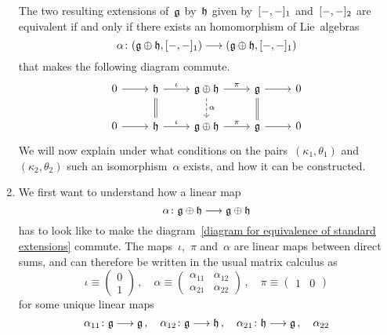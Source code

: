 \begin{fluff}
\begin{enumerate}[resume*]
			The two resulting extensions of~$\mathfrak{g}$ by~$\mathfrak{h}$ given by~$[-, -]_1$ and~$[-, -]_2$ are equivalent if and only if there exists an homomorphism of Lie~algebras
			\[
				\alpha
				\colon
				( \glie \oplus \hlie, [\ph, \ph]_1 )
				\to
				( \glie \oplus \hlie, [\ph, \ph]_1 )
			\]
			that makes the following diagram commute.
			\begin{equation}
				\label{diagram for equivalence of standard extensions}
				\begin{tikzcd}
					0
					\arrow{r}
					&
					\hlie
					\arrow{r}[above]{\iota}
					\arrow[equal]{d}
					&
					\glie \oplus \hlie
					\arrow{r}[above]{\pi}
					\arrow[dashed]{d}[right]{\alpha}
					&
					\glie
					\arrow{r}
					\arrow[equal]{d}
					&
					0
					\\
					0
					\arrow{r}
					&
					\hlie
					\arrow{r}[above]{\iota}
					&
					\glie \oplus \hlie
					\arrow{r}[above]{\pi}
					&
					\glie
					\arrow{r}
					&
					0
				\end{tikzcd}
			\end{equation}
			We will now explain under what conditions on the pairs~$(\kappa_1, \theta_1)$ and~$(\kappa_2, \theta_2)$ such an isomorphism~$\alpha$ exists, and how it can be constructed.
		\item
			We first want to understand how a linear map
			\[
				\alpha
				\colon
				\glie \oplus \hlie
				\to
				\glie \oplus \hlie
			\]
			has to look like to make the diagram~\eqref{diagram for equivalence of standard extensions} commute.
			The maps~$\iota$,~$\pi$ and~$\alpha$ are linear maps between direct sums, and can therefore be written in the usual matrix calculus as
			\[
				\iota
				\equiv
				\begin{pmatrix}
					0
					\\
					1
				\end{pmatrix} \,,
				\quad
				\alpha
				\equiv
				\begin{pmatrix}
					\alpha_{11} & \alpha_{12} \\
					\alpha_{21} & \alpha_{22}
				\end{pmatrix} \,,
				\quad
				\pi
				\equiv
				\begin{pmatrix}
					1 & 0
				\end{pmatrix}
			\]
			for some unique linear maps
			\[
				\alpha_{11}
				\colon
				\glie
				\to
				\glie \,,
				\quad
				\alpha_{12}
				\colon
				\glie
				\to
				\hlie \,,
				\quad
				\alpha_{21}
				\colon
				\hlie
				\to
				\glie \,,
				\quad
				\alpha_{22}
\]
\end{enumerate}
\end{fluff}
